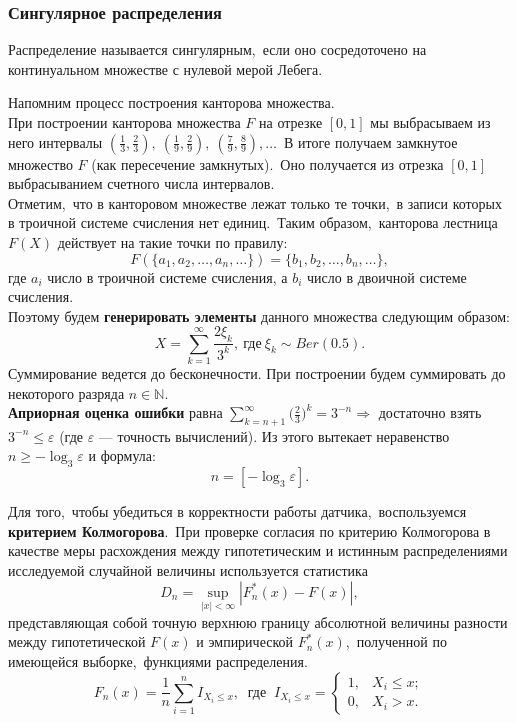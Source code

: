 \documentclass[11pt]{article}
\begin{document}
	\subsubsection{Сингулярное распределения}
	\begin{opr}
		 Распределение называется сингулярным,\ если оно сосредоточено на континуальном множестве с нулевой мерой Лебега.
	\end{opr}
	\indent Напомним процесс построения канторова множества.\\
	При построении канторова множества {$F$} на отрезке {$[0,1]$} мы выбрасываем из него интервалы {$(\frac{1}{3},\frac{2}{3}),~ (\frac{1}{9},\frac{2}{9}),~ (\frac{7}{9},\frac{8}{9}),\ldots$}\ В итоге получаем замкнутое множество {$F$} (как пересечение замкнутых).\ Оно получается из отрезка {$[0,1]$} выбрасыванием счетного числа интервалов.\\
	Отметим,\ что в канторовом множестве лежат только те точки,\ в записи которых в троичной системе счисления нет единиц.\ Таким образом,\ канторова лестница {$F(X)$} действует на такие точки по правилу:
	$$F(\{a_1,a_2,\ldots,a_n,\ldots\}) = \{b_1,b_2,\ldots,b_n,\ldots\},$$
	где {$a_i$} число в троичной системе счисления, а {$b_i$} число в двоичной системе счисления.\\
	Поэтому будем \textbf{генерировать элементы} данного множества следующим образом:
	$$X = \sum_{k = 1}^{\infty} \frac{2\xi_k}{3^k},~ \text{где}~ \xi_k\sim Ber(0.5).$$
	Суммирование ведется до бесконечности. При построении будем суммировать до некоторого разряда $n \in \mathbb{N}$. \\
	\textbf{Априорная оценка ошибки} равна $\sum_{k = n + 1}^{\infty} \big(\frac{2}{3}\big)^k = 3^{-n} \Rightarrow $ достаточно взять $3^{-n} \leq \varepsilon$ (где $\varepsilon$ --- точность вычислений). Из этого вытекает неравенство $n \geq -\log_3 \varepsilon$ и формула: 
	\[  n = [-\log_3\varepsilon]. \]
	
	\indent Для того,\ чтобы убедиться в корректности работы датчика,\ воспользуемся \textbf{критерием Колмогорова}.\ При проверке согласия по критерию Колмогорова в качестве меры расхождения
	между гипотетическим и истинным распределениями исследуемой случайной величины используется статистика
	$$D_n = \sup\limits_{|x|< \infty} |F^*_n(x) - F(x)|,$$
	представляющая собой точную верхнюю границу абсолютной величины разности
	между гипотетической {$F(x)$} и эмпирической {$F_n^*(x)$},\ полученной по имеющейся выборке,\ функциями распределения.\\
	\[ F_n(x) = \frac{1}{n}\sum_{i = 1}^{n}I_{X_i \leq x}, \  \text{  где  } \ I_{X_i \leq x} = \begin{cases}
	1, & X_i \leq x;\\
	0, & X_i > x.
	\end{cases} \]
	 
\end{document}
